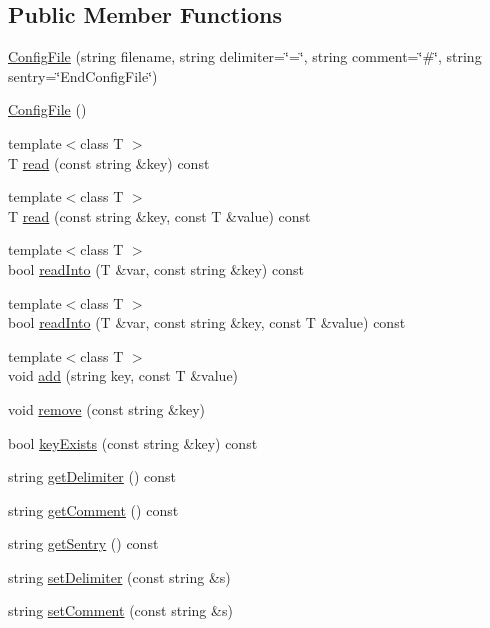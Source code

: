\subsection*{Public Member Functions}
\begin{DoxyCompactItemize}
\item 
\hyperlink{classConfigFile_a2690c3c6b72869b65d168791b28264dc}{ConfigFile} (string filename, string delimiter=\char`\"{}=\char`\"{}, string comment=\char`\"{}\#\char`\"{}, string sentry=\char`\"{}EndConfigFile\char`\"{})
\item 
\hyperlink{classConfigFile_a9ce259defdfaabeedb2455849ca6bd1e}{ConfigFile} ()
\item 
{\footnotesize template$<$class T $>$ }\\T \hyperlink{classConfigFile_a2c870b7009aa29208838fc73f8dde6af}{read} (const string \&key) const 
\item 
{\footnotesize template$<$class T $>$ }\\T \hyperlink{classConfigFile_a58fe3e41915e8f119a91d51d5d369014}{read} (const string \&key, const T \&value) const 
\item 
{\footnotesize template$<$class T $>$ }\\bool \hyperlink{classConfigFile_a7526e5aad42677251502b67c579d1539}{readInto} (T \&var, const string \&key) const 
\item 
{\footnotesize template$<$class T $>$ }\\bool \hyperlink{classConfigFile_a22b3d7f8312ca371631d75d803263f10}{readInto} (T \&var, const string \&key, const T \&value) const 
\item 
{\footnotesize template$<$class T $>$ }\\void \hyperlink{classConfigFile_a19311cc5817f42b2f985f2c2b72b3424}{add} (string key, const T \&value)
\item 
void \hyperlink{classConfigFile_afca295f72101b138ad2702a11c342f37}{remove} (const string \&key)
\item 
bool \hyperlink{classConfigFile_afd3d1146ae212a7e5802961f5ad3fe91}{keyExists} (const string \&key) const 
\item 
string \hyperlink{classConfigFile_adcc1df41c7d669a7cc81c47b85b0ee14}{getDelimiter} () const 
\item 
string \hyperlink{classConfigFile_a2b0cd50789ea83b1a12bf39293c7401a}{getComment} () const 
\item 
string \hyperlink{classConfigFile_adf270b0cf2a1b034fc18fd2e82296760}{getSentry} () const 
\item 
string \hyperlink{classConfigFile_af28390aba7d8f399ac734c074e659b99}{setDelimiter} (const string \&s)
\item 
string \hyperlink{classConfigFile_a2e06b3000fb45426c975b334b2cee148}{setComment} (const string \&s)
\end{DoxyCompactItemize}
